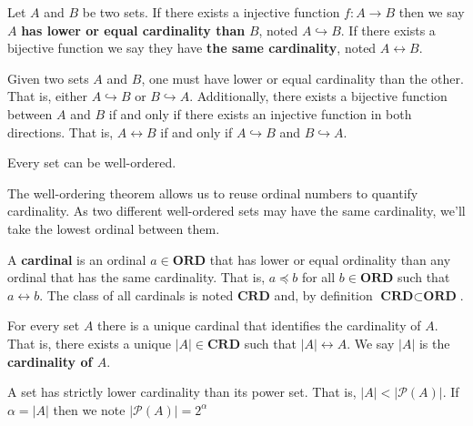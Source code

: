 \documentclass{article}
\newcommand{\marginleft}[1] {\reversemarginpar\marginpar{#1}}
\def\ordinals{\textbf{ORD}}
\def\cardinals{\textbf{CRD}}
\def\ordleq{\preceq}
\def\crdleq{\hookrightarrow}
\def\crdeq{\leftrightarrow}
\begin{document}
\begin{defn}
	Let $A$ \marginleft{Cardinality} and $B$ be two sets. If there exists a injective function $f : A \to B$ then we say $A$ \textbf{has lower or equal cardinality than} $B$, noted $A \crdleq B$. If there exists a bijective function we say they have \textbf{the same cardinality}, noted $A \crdeq B$.
\end{defn}

\begin{prop}
	Given two sets $A$ and $B$, one must have lower or equal cardinality than the other. That is, either $A \crdleq B$ or $B \crdleq A$. Additionally, there exists a bijective function between $A$ and $B$ if and only if there exists an injective function in both directions. That is, $A \crdeq B$ if and only if $A \crdleq B$ and $B \crdleq A$.
\end{prop}

\begin{prop}
	Every set can be well-ordered.
\end{prop}

\begin{remark}
	The well-ordering theorem allows us to reuse ordinal numbers to quantify cardinality. As two different well-ordered sets may have the same cardinality, we'll take the lowest ordinal between them.
\end{remark}

\begin{defn}
	A \textbf{cardinal}  \marginleft{Cardinals: $\cardinals$} is an ordinal $a \in \ordinals$ that has lower or equal ordinality than any ordinal that has the same cardinality. That is, $a \ordleq b$ for all $b \in \ordinals$ such that $a \crdeq b$. The class of all cardinals is noted $\cardinals$ and, by definition $\cardinals \subset \ordinals$.
\end{defn}

\begin{prop}
	For every \marginleft{$|A|$} set $A$ there is a unique cardinal that identifies the cardinality of $A$. That is, there exists a unique $|A| \in \cardinals$ such that $|A| \crdeq A$. We say $|A|$ is the \textbf{cardinality of $A$}.
\end{prop}

\begin{prop}
	A set has strictly lower cardinality than its power set. That is, $|A| < |\mathcal{P}(A)|$. If $\alpha = |A|$ then we note $|\mathcal{P}(A)| = 2^\alpha$
\end{prop}
\end{document}
